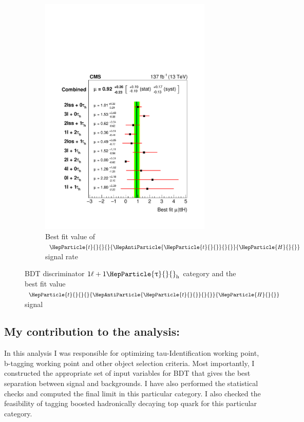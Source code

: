 \documentclass[12pt, a4paper]{article}
\DeclareRobustCommand{\PH}{{\HepParticle{H}{}{}}\xspace}
\DeclareRobustCommand{\PQt}{\HepParticle{t}{}{}} %
\DeclareRobustCommand{\PAQt}{{\HepAntiParticle{\PQt}{}{}}\xspace} %
\DeclareRobustCommand{\PGt}{{\HepParticle{\uptau}{}{}}\xspace} %
\newcommand{\ttbar}{\PQt{}\PAQt} %
\newcommand{\tauh}{\ensuremath{\PGt_\mathrm{h}}\xspace}
\newcommand{\ttH}{\ttbar\PH}
\begin{document}
\begin{figure}[htb!]
\begin{subfigure}[b]{0.5\textwidth}
	\includegraphics[width=0.9\textwidth]{Fig/Figure_013-a.pdf}
	\caption{Best fit value of $\ttbar\PH$ signal rate}
	\label{fig:best_fit}
\end{subfigure}	
\caption{BDT discriminator $1\ell+1\tauh$ category and the best fit value $\ttH$ signal}
\end{figure}

\subsection{My contribution to the analysis:}
In this analysis I was responsible for optimizing tau-Identification working point, b-tagging working point and other object selection criteria. Most importantly, I constructed the appropriate set of input variables for BDT that gives the best separation between signal and backgrounds. I have also performed the statistical checks and computed the final limit in this particular category. I also checked the feasibility of tagging boosted hadronically decaying top quark for this particular category.
\end{document}
